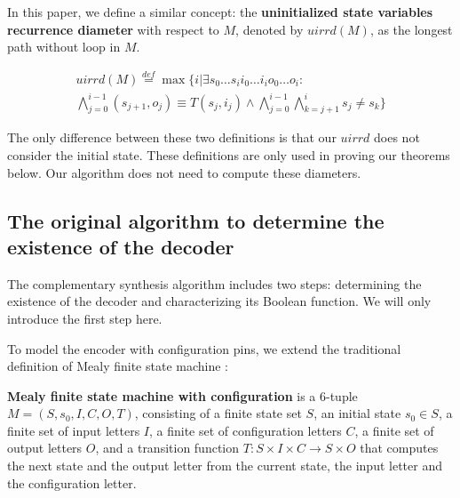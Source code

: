 \documentclass{sig-alternate}
\begin{document}
In this paper,
we define a similar concept: the \textbf{uninitialized state variables recurrence diameter} with respect to $M$,
denoted by $uirrd(M)$,
as the longest path without loop in $M$.

\begin{equation}\label{equ_uisvrd}
\begin{split}
uirrd(M)\stackrel{def}{=}\max\{i|\exists s_0 \dots s_i  i_0 \dots i_i o_0 \dots o_i:\\
\bigwedge^{i-1}_{j=0}(s_{j+1},o_j)\equiv T(s_j,i_j)\wedge\bigwedge^{i-1}_{j=0}\bigwedge^{i}_{k=j+1}s_{j}\ne s_{k}\}
\end{split}
\end{equation}

The only difference between these two definitions is that
our $uirrd$ does not consider the initial state.
These definitions are only used in proving our theorems below.
Our algorithm does not need to compute these diameters.


\subsection{The original algorithm to determine the existence of the decoder}\label{subsec_chkextdec}


The complementary synthesis algorithm\cite{ShengYuShen:iccad09} includes two steps:
determining the existence of the decoder and characterizing its Boolean function.
We will only introduce the first step here.

To model the encoder with configuration pins,
we extend the traditional definition of Mealy finite state machine \cite{MEALY}:

\begin{definition11}\label{MealyFSM}%
\textbf{Mealy finite state machine with configuration} is a 6-tuple $M=(S,s_0,I,C,O,T)$,
consisting of a finite state set $S$,
an initial state $s_0\in S$,
a finite set of input letters $I$,
a finite set of configuration letters $C$,
a finite set of output letters $O$,
and a transition function $T: S\times I\times C\to S\times O$ that computes the next state
and the output letter from the current state,
the input letter and the configuration letter.
\end{definition11}
\end{document}
